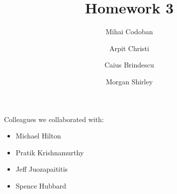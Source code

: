 \documentclass{article}
\title{Homework 3}
\author{Mihai Codoban \and Arpit Christi \and Caius Brindescu \and Morgan Shirley}
\begin{document}
\maketitle

Colleagues we collaborated with:
\begin{itemize}
	\item Michael Hilton
	\item Pratik Krishnamurthy
	\item Jeff Juozapaititis 
	\item Spence Hubbard
\end{itemize}








\end{document}
